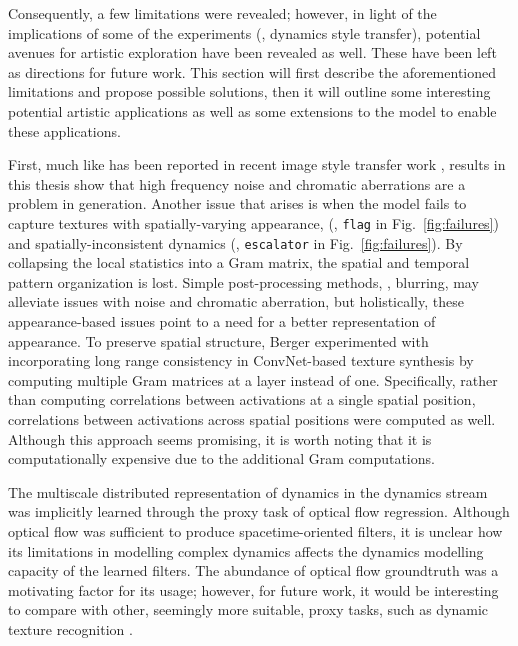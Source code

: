 Consequently, a few limitations were revealed; however, in light of the implications of some of the experiments (\eg, dynamics style transfer), potential avenues for artistic exploration have been revealed as well. These have been left as directions for future work. This section will first describe the aforementioned limitations and propose possible solutions, then it will outline some interesting potential artistic applications as well as some extensions to the model to enable these applications.

First, much like has been reported in recent image style transfer
work \cite{gatys2016image}, results in this thesis show that high frequency
noise and chromatic aberrations are a problem in generation. Another issue that arises is when the model fails to capture
textures with spatially-varying appearance, (\eg, 
\texttt{flag} in Fig.\ \ref{fig:failures}) and
spatially-inconsistent dynamics (\eg, \texttt{escalator} in 
Fig.\ \ref{fig:failures}).
By collapsing the local statistics into a Gram matrix, 
the spatial and temporal pattern organization is lost.
Simple post-processing methods, \eg, blurring, may alleviate issues with noise and chromatic aberration, but holistically, these appearance-based issues point to a need for a better representation of appearance. To preserve spatial structure, Berger \etal \cite{berger2016} experimented with incorporating long range consistency in ConvNet-based texture synthesis by computing multiple Gram matrices at a layer instead of one. Specifically, rather than computing correlations between activations at a single spatial position, correlations between activations across spatial positions were computed as well. Although this approach seems promising, it is worth noting that it is computationally expensive due to the additional Gram computations.

The multiscale distributed representation of dynamics in the dynamics stream was implicitly learned through the proxy task of optical flow regression. Although optical flow was sufficient to produce spacetime-oriented filters, it is unclear how its limitations in modelling complex dynamics affects the dynamics modelling capacity of the learned filters. The abundance of optical flow groundtruth was a motivating factor for its usage; however, for future work, it would be interesting to compare with other, seemingly more suitable, proxy tasks, such as dynamic texture recognition \cite{derpanis2012spacetime}.


